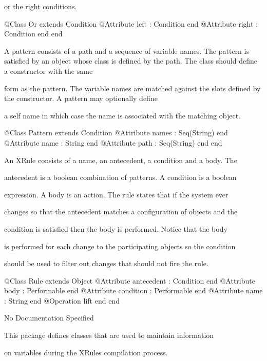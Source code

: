       or the right conditions.
\begin{Interface}
@Class Or extends Condition
  @Attribute left : Condition end
  @Attribute right : Condition end
end
\end{Interface}

      A pattern consists of a path and a sequence of variable names.
      The pattern is satisfied by an object whose class is defined by 
      the path. The class should define a constructor with the same

      form as the pattern. The variable names are matched against the 
      slots defined by the constructor. A pattern may optionally define

      a self name in which case the name is associated with the 
      matching object.
\begin{Interface}
@Class Pattern extends Condition
  @Attribute names : Seq(String) end
  @Attribute name : String end
  @Attribute path : Seq(String) end
end
\end{Interface}

      An XRule consists of a name, an antecedent, a condition and a body. The

      antecedent is a boolean combination of patterns. A condition is a boolean

      expression. A body is an action. The rule states that if the system ever

      changes so that the antecedent matches a configuration of objects and the

      condition is satisfied then the body is performed. Notice that the body

      is performed for each change to the participating objects so the condition

      should be used to filter out changes that should not fire the rule.
\begin{Interface}
@Class Rule extends Object
  @Attribute antecedent : Condition end
  @Attribute body : Performable end
  @Attribute condition : Performable end
  @Attribute name : String end
  @Operation lift end
end
\end{Interface}
No Documentation Specified

      This package defines classes that are used to maintain information

      on variables during the XRules compilation process.

